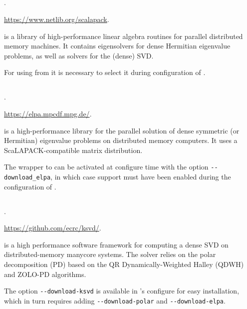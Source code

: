 \subsection*{\underline{\scalapack}}
\begin{description}
\setlength{\itemsep}{0pt}
\item[References.]\citep{Blackford:1997:SUG}.
\item[Website.] \url{https://www.netlib.org/scalapack}.
\item[Summary.] \scalapack is a library of high-performance linear algebra routines for parallel distributed memory machines. It contains eigensolvers for dense Hermitian eigenvalue problems, as well as solvers for the (dense) SVD.
\item[Installation.] For using \scalapack from \slepc it is necessary to select it during configuration of \petsc.
\end{description}

\subsection*{\underline{\elpa}}
\begin{description}
\setlength{\itemsep}{0pt}
\item[References.]\citep{Auckenthaler:2011:ELP}.
\item[Website.] \url{https://elpa.mpcdf.mpg.de/}.
\item[Summary.] \elpa is a high-performance library for the parallel solution of dense symmetric (or Hermitian) eigenvalue problems on distributed memory computers. It uses a ScaLAPACK-compatible matrix distribution.
\item[Installation.] The \slepc wrapper to \elpa can be activated at configure time with the option \texttt{-{}-download\_elpa}, in which case \scalapack support must have been enabled during the configuration of \petsc.
\end{description}

\subsection*{\underline{\ksvd}}
\begin{description}
\setlength{\itemsep}{0pt}
\item[References.]\citep{Sukkari:2019:QDW}.
\item[Website.] \url{https://github.com/ecrc/ksvd/}.
\item[Summary.] \ksvd is a high performance software framework for computing a dense SVD on distributed-memory manycore systems. The \ksvd solver relies on the polar decomposition (PD) based on the QR Dynamically-Weighted Halley (QDWH) and ZOLO-PD algorithms.
\item[Installation.] The option \texttt{-{}-download-ksvd} is available in \slepc's configure for easy installation, which in turn requires adding \texttt{-{}-download-polar} and \texttt{-{}-download-elpa}.
\end{description}

